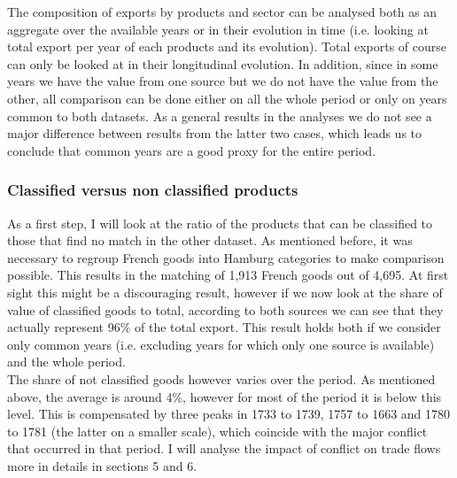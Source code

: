 \documentclass[12pt,a4paper,titlepage]{article}
\begin{document}
The composition of exports by products and sector can be analysed both as an aggregate over the available years or in their evolution in time (i.e. looking at total export per year of each products and its evolution). Total exports of course can only be looked at in their longitudinal evolution. In addition, since in some years we have the value from one source but we do not have the value from the other, all comparison can be done either on all the whole period or only on years common to both datasets. As a general results in the analyses we do not see a major difference between results from the latter two cases, which leads us to conclude that common years are a good proxy for the entire period. 

\subsubsection{Classified versus non classified products}
As a first step, I will look at the ratio of the products that can be classified to those that find no match in the other dataset. As mentioned before, it was necessary to regroup French goods into Hamburg categories to make comparison possible. This results in the matching of 1,913 French goods out of 4,695. At first sight this might be a discouraging result, however if we now look at the share of value of classified goods to total, according to both sources we can see that they actually represent 96\% of the total export. This result holds both if we consider only common years (i.e. excluding years for which only one source is available) and the whole period. \\
The share of not classified goods however varies over the period. As mentioned above, the average is around 4\%, however for most of the period it is below this level. This is compensated by three peaks in 1733 to 1739, 1757 to 1663 and 1780 to 1781 (the latter on a smaller scale), which coincide with the major conflict that occurred in that period. I will analyse the impact of conflict on trade flows more in details in sections 5 and 6.
\end{document}
